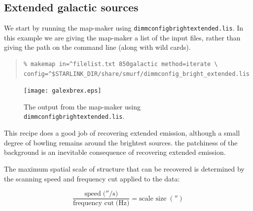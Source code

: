 \documentclass[twoside,11pt]{article}
\newcounter{box}
\newcommand{\xref}[3]{#1}
\newcommand{\xlabel}[1]{}
\renewcommand{\_}{\texttt{\symbol{95}}}
\newenvironment{myquote}{\begin{quote}\begin{small}}{\end{small}\end{quote}}
\newcommand{\cupid}{\xref{\textsc{Cupid}}{sun255}{}}
\newcommand{\picard}{\xref{\textsc{Picard}}{sun265}{}}
\newcommand{\drrecipe}[1]{\texttt{#1}}
\newcommand{\task}[1]{\textsf{#1}}
\newcommand{\param}[1]{\texttt{#1}}
\newcommand{\findback}{\xref{\task{findback}}{sun255}{FINDBACK}}
\begin{document}
\subsection{\xlabel{Galactic}Extended galactic sources}
\label{sec:bright_ex}

We start by running the map-maker using \texttt{dimmconfig\_bright\_extended.lis}. In this example we are giving the map-maker a list of the input files, rather than giving the path on the command line (along with wild cards). 

\begin{myquote}
\begin{verbatim}
% makemap in=^filelist.txt 850galactic method=iterate \
config=^$STARLINK_DIR/share/smurf/dimmconfig_bright_extended.lis
\end{verbatim}
\end{myquote}

\begin{figure}[t!]
\begin{center}
\texttt{[image: galex\_brex.eps]}
\caption{\small The output from the map-maker using \texttt{dimmconfig\_bright\_extended.lis}.}
\label{fig:galmakemap}
\end{center}
\end{figure}


This recipe does a good job of recovering extended emission, although a small degree of bowling remains around the brightest sources. the patchiness of the background is an inevitable consequence of recovering extended emission.

The maximum spatial scale of structure that can be recovered is determined by the scanning speed and frequency cut applied to the data:

\begin{equation}
\frac{\mbox{speed}\;(''/\mbox{s)}}{\mbox{frequency cut}\;(\mbox{Hz)}}=\mbox{scale size}\;('')
\end{equation}
\end{document}
